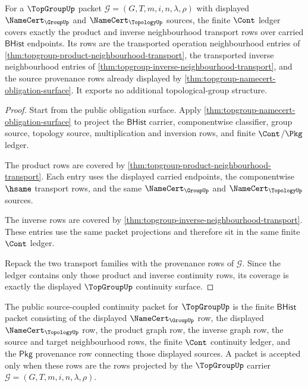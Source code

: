 \begin{theorem}
\label{thm:topgroup-continuity-ledger-coverage}
For a $\TopGroupUp$ packet
$\mathcal G=(G,T,m,i,n,\lambda,\rho)$ with displayed
$\NameCert_{\GroupUp}$ and $\NameCert_{\TopologyUp}$ sources, the finite
$\Cont$ ledger covers exactly the product and inverse neighbourhood transport
rows over carried $\mathsf{BHist}$ endpoints. Its rows are the transported
operation neighbourhood entries of
\autoref{thm:topgroup-product-neighbourhood-transport}, the transported
inverse neighbourhood entries of
\autoref{thm:topgroup-inverse-neighbourhood-transport}, and the source
provenance rows already displayed by
\autoref{thm:topgroup-namecert-obligation-surface}. It exports no additional
topological-group structure.
\end{theorem}
\begin{proof}
Start from the public obligation surface. Apply
\autoref{thm:topgroup-namecert-obligation-surface} to project the
$\mathsf{BHist}$ carrier, componentwise classifier, group source, topology
source, multiplication and inversion rows, and finite $\Cont$/$\Pkg$ ledger.

The product rows are covered by
\autoref{thm:topgroup-product-neighbourhood-transport}. Each entry uses the
displayed carried endpoints, the componentwise $\hsame$ transport rows, and
the same $\NameCert_{\GroupUp}$ and $\NameCert_{\TopologyUp}$ sources.

The inverse rows are covered by
\autoref{thm:topgroup-inverse-neighbourhood-transport}. These entries use the
same packet projections and therefore sit in the same finite $\Cont$ ledger.

Repack the two transport families with the provenance rows of $\mathcal G$.
Since the ledger contains only those product and inverse continuity rows, its
coverage is exactly the displayed $\TopGroupUp$ continuity surface.
\end{proof}

\begin{definition}
\label{def:topgroup-source-coupled-continuity-packet}
The public source-coupled continuity packet for $\TopGroupUp$ is the finite
$\mathsf{BHist}$ packet consisting of the displayed
$\NameCert_{\GroupUp}$ row, the displayed $\NameCert_{\TopologyUp}$ row, the
product graph row, the inverse graph row, the source and target neighbourhood
rows, the finite $\Cont$ continuity ledger, and the $\mathsf{Pkg}$ provenance
row connecting those displayed sources. A packet is accepted only when these
rows are the rows projected by the $\TopGroupUp$ carrier
$\mathcal G=(G,T,m,i,n,\lambda,\rho)$.
\end{definition}

